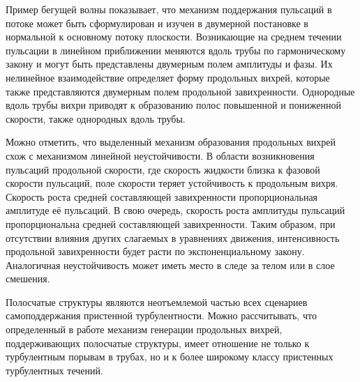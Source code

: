 Пример бегущей волны показывает, что механизм поддержания пульсаций в потоке может быть сформулирован и изучен в двумерной постановке в нормальной к основному потоку плоскости. Возникающие на среднем течении пульсации в линейном приближении меняются вдоль трубы по гармоническому закону и могут быть представлены двумерным полем амплитуды и фазы. Их нелинейное взаимодействие определяет форму продольных вихрей, которые также представляются двумерным полем продольной завихренности. Однородные вдоль трубы вихри приводят к образованию полос повышенной и пониженной скорости, также однородных вдоль трубы. 

Можно отметить, что выделенный механизм образования продольных вихрей схож с механизмом линейной неустойчивости. В области возникновения пульсаций продольной скорости, где скорость жидкости близка к фазовой скорости пульсаций, поле скорости теряет устойчивость к продольным вихря. Скорость роста средней составляющей завихренности пропорциональная амплитуде её пульсаций. В свою очередь, скорость роста амплитуды пульсаций пропорциональна средней составляющей завихренности. Таким образом, при отсутствии влияния других слагаемых в уравнениях движения, интенсивность продольной завихренности будет расти по экспоненциальному закону. Аналогичная неустойчивость может иметь место в следе за телом или в слое смешения. 

Полосчатые структуры являются неотъемлемой частью всех сценариев самоподдержания пристенной турбулентности. Можно рассчитывать, что определенный в работе механизм генерации продольных вихрей, поддерживающих полосчатые структуры, имеет отношение не только к турбулентным порывам в трубах, но и к более широкому классу пристенных турбулентных течений.






